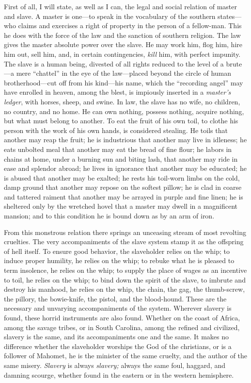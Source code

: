 First of all, I will state, as well as I can, the legal and social
relation of master and slave. A master is one---to speak in the
vocabulary of the southern states---who claims and exercises a right of
property in the person of a fellow-man. This he does with the force of
the law and the sanction of southern religion. The law gives the master
absolute power over the slave. He may work him, flog him, hire him out,
sell him, and, in certain contingencies, \emph{kill} him, with perfect
impunity. The slave is a human being, divested of all rights reduced to
the level of a brute---a mere ``chattel'' in the eye of the law---placed
beyond the circle of human brotherhood---cut off from his kind---his
name, which the ``recording angel'' may have enrolled in heaven, among
the blest, is impiously inserted in a \emph{master's ledger}, with
horses, sheep, and swine. In law, the slave has no wife, no children, no
country, and no home. He {\protect\hypertarget{430}{}{}}can own nothing,
possess nothing, acquire nothing, but what must belong to another. To
eat the fruit of his own toil, to clothe his person with the work of his
own hands, is considered stealing. He toils that another may reap the
fruit; he is industrious that another may live in idleness; he eats
unbolted meal that another may eat the bread of fine flour; he labors in
chains at home, under a burning sun and biting lash, that another may
ride in ease and splendor abroad; he lives in ignorance that another may
be educated; he is abused that another may be exalted; he rests his
toil-worn limbs on the cold, damp ground that another may repose on the
softest pillow; he is clad in coarse and tattered raiment that another
may be arrayed in purple and fine linen; he is sheltered only by the
wretched hovel that a master may dwell in a magnificent mansion; and to
this condition he is bound down as by an arm of iron.

From this monstrous relation there springs an unceasing stream of most
revolting cruelties. The very accompaniments of the slave system stamp
it as the offspring of hell itself. To ensure good behavior, the
slaveholder relies on the whip; to induce proper humility, he relies on
the whip; to rebuke what he is pleased to term insolence, he relies on
the whip; to supply the place of wages as an incentive to toil, he
relies on the whip; to bind down the spirit of the slave, to imbrute and
destroy his manhood, he relies on the whip, the chain, the gag, the
thumb-screw, the pillory, the bowie-knife, the pistol, and the
blood-hound. These are the necessary and unvarying accompaniments of the
system. Wherever slavery is found, these horrid instruments are also
found. Whether on the coast of Africa, among the savage tribes, or in
South Carolina, among the refined and civilized, slavery is the same,
and its accompaniments one and the same. It makes no difference whether
the slaveholder worships the God of the christians, or is a follower of
Mahomet, he is the minister of the same cruelty, and the author of the
same misery. \emph{Slavery} is always \emph{slavery;} always the same
foul, haggard, and damning scourge, whether found in the eastern or in
the western hemisphere.

